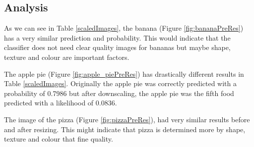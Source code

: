 \tocless\subsection{Analysis}
As we can see in Table \ref{scaledImages}, the banana (Figure \ref{fig:bananaPreRes}) has a very similar prediction and probability.
This would indicate that the classifier does not need clear quality images for bananas but maybe shape, texture and colour are important factors.

The apple pie (Figure \ref{fig:apple_piePreRes}) has drastically different results in Table \ref{scaledImages}.
Originally the apple pie was correctly predicted with a probability of 0.7986 but after downscaling, the apple pie was the fifth food predicted with a likelihood of 0.0836.

The image of the pizza (Figure \ref{fig:pizzaPreRes}), had very similar results before and after resizing.
This might indicate that pizza is determined more by shape, texture and colour that fine quality.


